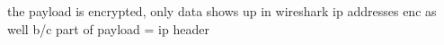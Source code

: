 the payload is encrypted, only data shows up in wireshark
ip addresses enc as well b/c part of payload = ip header
